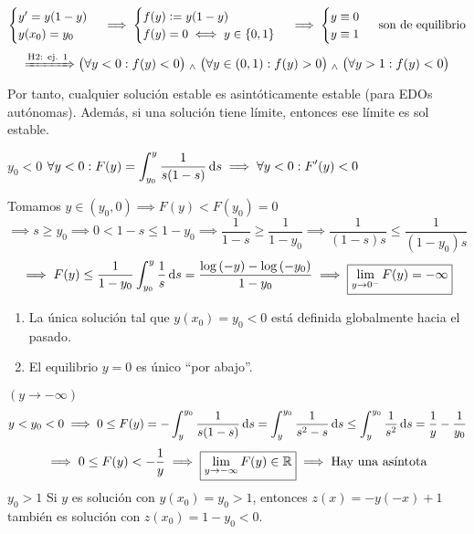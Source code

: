 \begin{ejem}
	\[\begin{cases}
			y'=y(1-y) \\
			y(x_0)=y_0
		\end{cases} \implies \begin{cases}
			f(y)\vcentcolon= y(1-y) \\
			f(y) = 0 \iff y \in \{0, 1\}
		\end{cases} \implies \begin{cases}
			y \equiv 0 \\
			y \equiv 1 \\
		\end{cases}\text{ son de equilibrio}\]
	\[\xRightarrow{\text{H2: ej. 1}} \big(\forall y < 0 :f(y) < 0\big) \; _{\wedge} \; \big(\forall y \in (0, 1) : f(y) > 0\big) \; _{\wedge} \; \big(\forall y > 1 : f(y) < 0\big)\]
	Por tanto, cualquier solución estable es asintóticamente estable (para EDOs autónomas). Además, si una solución tiene límite, entonces ese límite es sol estable.

	$\boxed{y_0 < 0}$ \hspace{1cm}$\ds \forall y < 0 : F(y)=\int_{y_0}^{y}\frac{1}{s(1-s)}\odif{s} \implies \forall y<0 : F'(y)<0$

	Tomamos $y\in (y_0, 0) \implies F(y)<F(y_0)=0$
	\[\implies s \geq y_0 \implies 0<1-s \leq 1-y_0 \implies \frac{1}{1-s}\geq\frac{1}{1-y_0} \implies \frac{1}{(1-s)s}\leq \frac{1}{(1-y_0)s}\]
	\[\implies F(y) \leq \frac{1}{1-y_0}\int_{y_0}^{y} \frac{1}{s} \odif{s} = \frac{\log{(-y)} - \log{(-y_0)}}{1-y_0} \implies \boxed{\lim_{y\to0^-} F(y) = -\infty}\]
	\begin{enumerate}
		\item La única solución tal que $y(x_0)=y_0<0$ está definida globalmente hacia el pasado.
		\item El equilibrio $y=0$ es único ``por abajo''.
	\end{enumerate}
	$(y\to-\infty)$
	\[y<y_0<0 \implies 0 \leq F(y)=-\int_{y}^{y_0} \frac{1}{s(1-s)} \odif{s} = \int_{y}^{y_0} \frac{1}{s^2-s} \odif{s} \leq \int_{y}^{y_0} \frac{1}{s^2} \odif{s} = \frac{1}{y} -\frac{1}{y_0}\]
	\[\implies 0\leq F(y) < -\frac{1}{y} \implies \boxed{\lim_{y\to -\infty} F(y) \in \mathbb{R}} \implies \text{Hay una asíntota}\]
	$\boxed{y_0>1}$ Si $y$ es solución con $y(x_0)=y_0>1$, entonces $z(x)=-y(-x)+1$ también es solución con $z(x_0)=1-y_0<0$.
\end{ejem}

